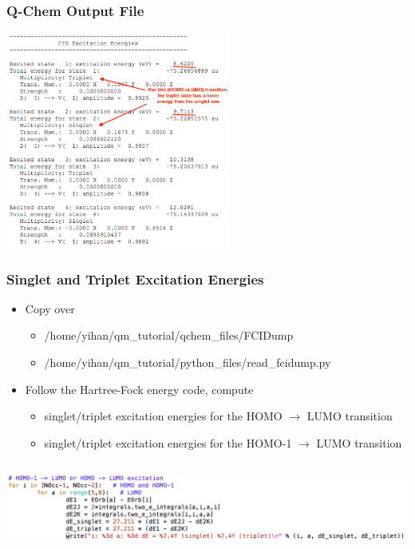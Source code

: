 \documentclass{beamer} %
\begin{document}
\begin{frame}
\frametitle{Q-Chem Output File} 
\begin{center}
\includegraphics[height=2.8in]{figures/cis-output.png}
\end{center}
\end{frame}

\begin{frame}
\frametitle{Singlet and Triplet Excitation Energies}
\begin{itemize}
\item \small{Copy over}
\begin{itemize}
\item /home/yihan/qm\_tutorial/qchem\_files/FCIDump
\item /home/yihan/qm\_tutorial/python\_files/read\_fcidump.py
\end{itemize}
\item Follow the Hartree-Fock energy code, compute
\begin{itemize} 
\item \footnotesize{singlet/triplet excitation energies for the HOMO $\rightarrow$ LUMO transition}
\item singlet/triplet excitation energies for the HOMO-1 $\rightarrow$ LUMO transition 
\end{itemize}
\end{itemize}
\begin{center}
\includegraphics[height=1.2in]{figures/cis-code-1.png}
\end{center}
\end{frame}
\end{document}
